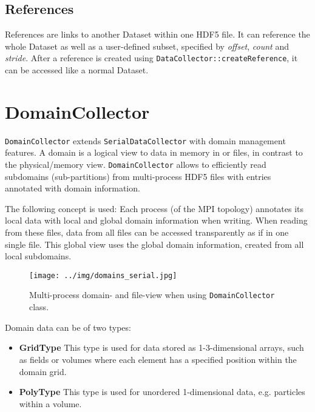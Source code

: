 \documentclass[a4paper,10pt,BCOR12mm]{report}
\newcommand{\code}[1]{\small \texttt{#1}}
\begin{document}

\section{References}

References are links to another Dataset within one HDF5 file.
It can reference the whole Dataset as well as a user-defined subset, specified
by \emph{offset}, \emph{count} and \emph{stride}.
After a reference is created using \code{DataCollector::createReference},
it can be accessed like a normal Dataset.


\chapter{DomainCollector}

\code{DomainCollector} extends \code{SerialDataCollector} with domain management features.
A domain is a logical view to data in memory in or files, in contrast to the physical/memory view.
\code{DomainCollector} allows to efficiently read subdomains (sub-partitions) from multi-process
HDF5 files with entries annotated with domain information.

The following concept is used: Each process (of the MPI topology)
annotates its local data with local and global domain information when writing.
When reading from these files, data from all files can be accessed transparently as if in one single file.
This global view uses the global domain information, created from all local subdomains.

\begin{figure}[hb]
 \texttt{[image: ../img/domains\_serial.jpg]}
 \caption{Multi-process domain- and file-view when using \code{DomainCollector} class.}
\end{figure}

Domain data can be of two types:
\begin{itemize}
	\item \textbf{GridType}
	This type is used for data stored as 1-3-dimensional arrays, such as fields or volumes
	where each element has a specified position within the domain grid.

	\item \textbf{PolyType}
	This type is used for unordered 1-dimensional data, e.g. particles within a volume.
\end{itemize}
\end{document}
